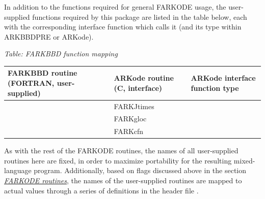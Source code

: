 \documentclass[letterpaper,10pt,english]{sphinxmanual}
\begin{document}
In addition to the functions required for general FARKODE usage, the
user-supplied functions required by this package are listed in the
table below, each with the corresponding interface function which
calls it (and its type within ARKBBDPRE or ARKode).

\emph{Table: FARKBBD function mapping}

\begin{tabulary}{\linewidth}{|L|L|L|}
\hline
\textbf{
FARKBBD routine
(FORTRAN, user-supplied)
} & \textbf{
ARKode routine
(C, interface)
} & \textbf{
ARKode interface
function type
}\\\hline

{\hyperref[f_interface/Usage:f/_/FARKJTIMES]{}}
 & 
FARKJtimes
 & 
{\hyperref[c_interface/User_supplied:ARKSpilsJacTimesVecFn]{}}
\\\hline

{\hyperref[f_interface/Preconditioning:f/_/FARKGLOCFN]{}}
 & 
FARKgloc
 & 
{\hyperref[c_interface/Preconditioners:ARKLocalFn]{}}
\\\hline

{\hyperref[f_interface/Preconditioning:f/_/FARKCOMMFN]{}}
 & 
FARKcfn
 & 
{\hyperref[c_interface/Preconditioners:ARKCommFn]{}}
\\\hline
\end{tabulary}


As with the rest of the FARKODE routines, the names of all
user-supplied routines here are fixed, in order to maximize
portability for the resulting mixed-language program.  Additionally,
based on flags discussed above in the section {\hyperref[f_interface/Routines:finterface-routines]{\emph{FARKODE routines}}},
the names of the user-supplied routines are mapped to actual values
through a series of definitions in the header file .
\end{document}

